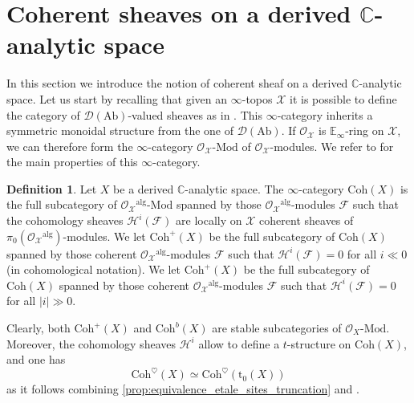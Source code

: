 \documentclass[12pt,a4paper,reqno]{amsart}
\theoremstyle{plain}
\theoremstyle{definition}
\newtheorem{defin}[thm]{Definition}
\theoremstyle{remark}
\numberwithin{equation}{section}
\begin{document}
\section{Coherent sheaves on a derived {$\mathbb C$-analytic\xspace} space} \label{sec:coherent_sheaves}

In this section we introduce the notion of coherent sheaf on a derived {$\mathbb C$-analytic\xspace} space.
Let us start by recalling that given an $\infty$-topos ${\mathcal X}$ it is possible to define the category of ${{{\mathcal D}({\mathrm{Ab}})}}$-valued sheaves as in \cite[Â§1.1]{DAG-V}.
This $\infty$-category inherits a symmetric monoidal structure from the one of ${{{\mathcal D}({\mathrm{Ab}})}}$.
If ${\mathcal O}_{\mathcal X}$ is $\mathbb E_\infty$-ring on ${\mathcal X}$, we can therefore form the $\infty$-category ${\mathcal O}_{\mathcal X} \textrm{-} {\mathrm{Mod}}$ of ${\mathcal O}_{\mathcal X}$-modules.
We refer to \cite[Proposition 2.1.3]{DAG-VIII} for the main properties of this $\infty$-category.

\begin{defin} \label{def:coherent_sheaf_derived_canal_space}
	Let $X$ be a derived {$\mathbb C$-analytic\xspace} space.
	The $\infty$-category ${\mathrm{Coh}}(X)$ is the full subcategory of ${\mathcal O}_{\mathcal X}{^\mathrm{alg}} \textrm{-} {\mathrm{Mod}}$ spanned by those ${\mathcal O}_{\mathcal X}{^\mathrm{alg}}$-modules ${\mathcal F}$ such that the cohomology sheaves ${\mathcal H}^i({\mathcal F})$ are locally on ${\mathcal X}$ coherent sheaves of $\pi_0({\mathcal O}_{\mathcal X}{^\mathrm{alg}})$-modules.
	We let ${\mathrm{Coh}}^+(X)$ be the full subcategory of ${\mathrm{Coh}}(X)$ spanned by those coherent ${\mathcal O}_{\mathcal X}{^\mathrm{alg}}$-modules ${\mathcal F}$ such that ${\mathcal H}^i({\mathcal F}) = 0$ for all $i \ll 0$ (in cohomological notation).
	We let ${\mathrm{Coh}}^+(X)$ be the full subcategory of ${\mathrm{Coh}}(X)$ spanned by those coherent ${\mathcal O}_{\mathcal X}{^\mathrm{alg}}$-modules ${\mathcal F}$ such that ${\mathcal H}^i({\mathcal F}) = 0$ for all $|i| \gg 0$.
\end{defin}

Clearly, both ${\mathrm{Coh}}^+(X)$ and ${\mathrm{Coh}}^b(X)$ are stable subcategories of ${\mathcal O}_X \textrm{-} {\mathrm{Mod}}$.
Moreover, the cohomology sheaves ${\mathcal H}^i$ allow to define a $t$-structure on ${\mathrm{Coh}}(X)$, and one has
\[ {\mathrm{Coh}}^\heartsuit(X) \simeq {\mathrm{Coh}}^\heartsuit({\mathrm{t}_0}(X)) \]
as it follows combining \cref{prop:equivalence_etale_sites_truncation} and \cite[Remark 2.1.5]{DAG-VIII}.
\end{document}
